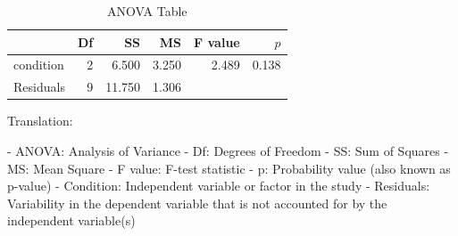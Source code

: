 \begin{table}[ht]
	\centering
	\caption{ANOVA Table}
	\begin{tabular}{lrrrrr}
		\hline
		          & Df & SS     & MS    & F value & $p$   \\
		\hline
		condition & 2  & 6.500  & 3.250 & 2.489   & 0.138 \\
		Residuals & 9  & 11.750 & 1.306 &         &       \\
		\hline
	\end{tabular}
	\label{tbl::21_05}
\end{table}

Translation:

- ANOVA: Analysis of Variance
- Df: Degrees of Freedom
- SS: Sum of Squares
- MS: Mean Square
- F value: F-test statistic
- p: Probability value (also known as p-value)
- Condition: Independent variable or factor in the study
- Residuals: Variability in the dependent variable that is not accounted for by the independent variable(s)
